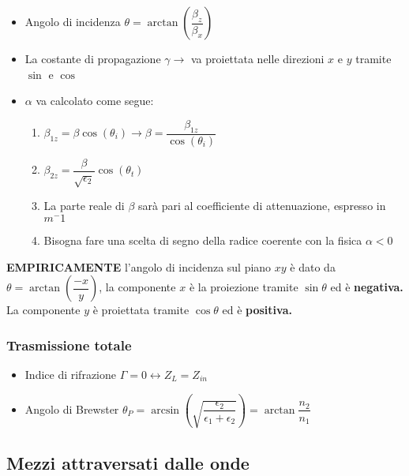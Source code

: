 \documentclass{article}
\begin{document}
\begin{itemize}
	\item Angolo di incidenza \( \theta = \arctan\left( \dfrac{\beta_z}{\beta_x} \right) \)
	\item La costante di propagazione \(\gamma \rightarrow\) va proiettata nelle direzioni \(x\) e \(y\) tramite \(\sin\) e \(\cos\)
	\item \(\alpha\) va calcolato come segue:
	\begin{enumerate}
		\item \(\beta_{1z} = \beta \cos(\theta_i) \rightarrow \beta = \dfrac{\beta_{1z}}{\cos(\theta_i)} \)
		\item \( \beta_{2z} = \dfrac{\beta}{\sqrt{\epsilon_2}} \cos(\theta_t) \)
		\item La parte reale di \(\beta\) sarà pari al coefficiente di attenuazione, espresso in \(m^-1\)
		\item Bisogna fare una scelta di segno della radice coerente con la fisica \( \alpha < 0 \)
	\end{enumerate}
\end{itemize}

\textbf{EMPIRICAMENTE} l'angolo di incidenza sul piano \(xy\) è dato da \(\theta = \arctan \left( \dfrac{-x}{y} \right) \), la componente \(x\) è la proiezione tramite \(\sin\theta\) ed è \textbf{negativa.} La componente \(y\) è proiettata tramite \(\cos\theta\) ed è \textbf{positiva.}

\subsubsection{Trasmissione totale}
\begin{itemize}
	\item Indice di rifrazione \( \Gamma = 0 \leftrightarrow Z_L = Z_{in} \)
	\item Angolo di Brewster \( \theta_P = \arcsin\left(\sqrt{\dfrac{\epsilon_2}{\epsilon_1 + \epsilon_2}}\right) = \arctan\dfrac{n_2}{n_1}\)
\end{itemize}

\subsection{Mezzi attraversati dalle onde}
\end{document}
